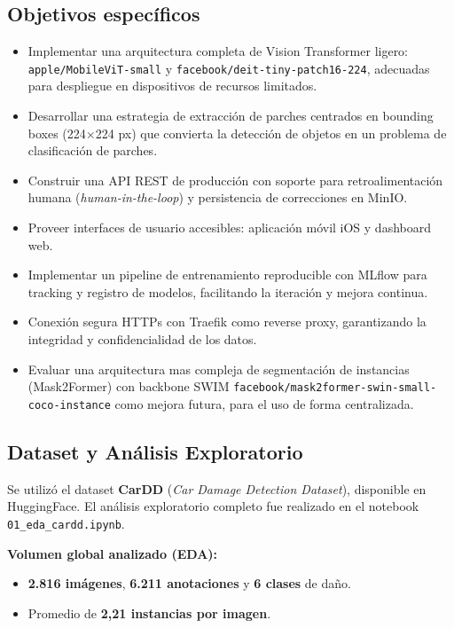 \documentclass[12pt,a4paper]{article}
\begin{document}
\subsection*{Objetivos específicos}
\begin{itemize}
  \item Implementar una arquitectura completa de Vision Transformer ligero: \\
        \texttt{apple/MobileViT-small} y \texttt{facebook/deit-tiny-patch16-224}, adecuadas para despliegue en
        dispositivos de recursos limitados.
  \item Desarrollar una estrategia de extracción de parches centrados en bounding boxes
        (224$\times$224 px) que convierta la detección de objetos en un problema de
        clasificación de parches.
  \item Construir una API REST de producción con soporte para retroalimentación humana
        (\textit{human-in-the-loop}) y persistencia de correcciones en MinIO.
  \item Proveer interfaces de usuario accesibles: aplicación móvil iOS y dashboard web.
  \item Implementar un pipeline de entrenamiento reproducible con MLflow para tracking y
        registro de modelos, facilitando la iteración y mejora continua.
  \item Conexión segura HTTPs con Traefik como reverse proxy, garantizando la integridad y confidencialidad de los datos.
  \item Evaluar una arquitectura mas compleja de segmentación de instancias (Mask2Former) con backbone SWIM \texttt{facebook/mask2former-swin-small-coco-instance} como mejora futura, para el uso de forma centralizada.
\end{itemize}

\subsection*{Dataset y Análisis Exploratorio}

Se utilizó el dataset \textbf{CarDD} (\textit{Car Damage Detection Dataset}), disponible
en HuggingFace. El análisis exploratorio completo fue realizado en el notebook
\texttt{01\_eda\_cardd.ipynb}.

\textbf{Volumen global analizado (EDA):}
\begin{itemize}
  \item \textbf{2.816 imágenes}, \textbf{6.211 anotaciones} y \textbf{6 clases} de daño.
  \item Promedio de \textbf{2,21 instancias por imagen}.
\end{itemize}
\end{document}
